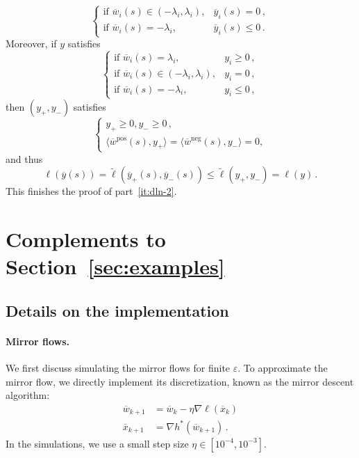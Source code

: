 \documentclass[11pt,english,reqno]{article}
\newcommand{\pos}{\text{pos}}
\renewcommand{\neg}{\text{neg}}
\renewcommand{\leq}{\leqslant}
\renewcommand{\geq}{\geqslant}
\theoremstyle{plain}
\theoremstyle{definition}
\theoremstyle{remark}
\numberwithin{equation}{section}
\begin{document}
\begin{enumerate}[label=(\alph*)]
\begin{equation*}
\begin{cases}
		\text{if }\overline{w}_i(s) \in (-\lambda_i, \lambda_i), & \overline{y}_i(s) = 0 \, , \\
		\text{if }\overline{w}_i(s) = -\lambda_i, & \overline{y}_i(s) \leq 0 \, .
		\end{cases}
		\end{equation*}
		Moreover, if $y$ satisfies 
		\begin{equation*}
		\begin{cases}
		\text{if }\overline{w}_i(s) = \lambda_i, & y_i \geq 0 \, , \\
		\text{if }\overline{w}_i(s) \in (-\lambda_i, \lambda_i), & y_i = 0 \, , \\
		\text{if }\overline{w}_i(s) = -\lambda_i, & y_i \leq 0 \, ,
		\end{cases}
		\end{equation*}
		then $(y_+, y_-)$ satisfies
		\begin{equation*}
		\begin{cases}
			y_+ \geq 0, y_- \geq 0 \, , \\
			\langle \overline{w}^\pos(s), y_+ \rangle = \langle \overline{w}^\neg(s), y_- \rangle = 0,
		\end{cases}
		\end{equation*}
		and thus
		\begin{equation*}
			\ell(\overline{y}(s)) = \widetilde{\ell}(\overline{y}_+(s), \overline{y}_-(s)) \leq \widetilde{\ell}(y_+, y_-) = \ell(y) \, .
		\end{equation*}
		This finishes the proof of part~\ref{it:dln-2}.
\end{enumerate}


\section{Complements to Section~\ref{sec:examples}}

\subsection{Details on the implementation}
\label{app:implementation}

\paragraph*{Mirror flows.}
We first discuss simulating the mirror flows for finite $\varepsilon$. To approximate the mirror flow, we directly implement its discretization, known as the mirror descent algorithm:
\begin{align*}
	\overline{w}_{k+1} &= \overline{w}_k - \eta \nabla \ell(\overline{x}_k) \\
	\overline{x}_{k+1} &= \nabla h^*(\overline{w}_{k+1})\, .
\end{align*}
%
In the simulations, we use a small step size $\eta \in [10^{-4}, 10^{-3}]$. 
%
\end{document}
